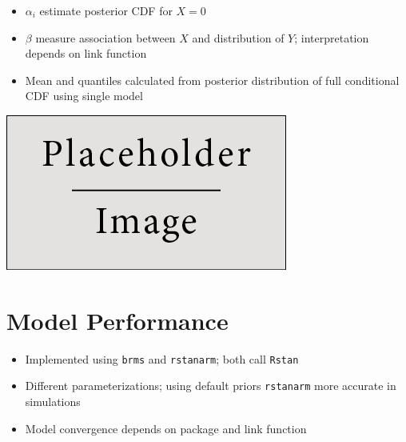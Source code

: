 \documentclass{beamer}
\begin{document}
	\begin{frame}
		\begin{itemize}
		\item $\alpha_i$  estimate posterior CDF for $X=0$
		\item $\beta$ measure association between $X$ and distribution of $Y$; interpretation depends on link function 
        \item Mean and quantiles calculated from posterior distribution of full conditional CDF using single model
		\end{itemize}
		\begin{center}
			\includegraphics[scale=0.53]{fig/placeholder}
		\end{center}
	\end{frame}
	
\section{Model Performance}

	\begin{frame}
		\begin{itemize}
		\item Implemented using \texttt{brms} and \texttt{rstanarm}; both call \texttt{Rstan}
		\item Different parameterizations; using default priors \texttt{rstanarm} more accurate in simulations 
		\item Model convergence depends on package and link function
		\end{itemize}
		\begin{center}
		\end{center}
	\end{frame}
\end{document}
